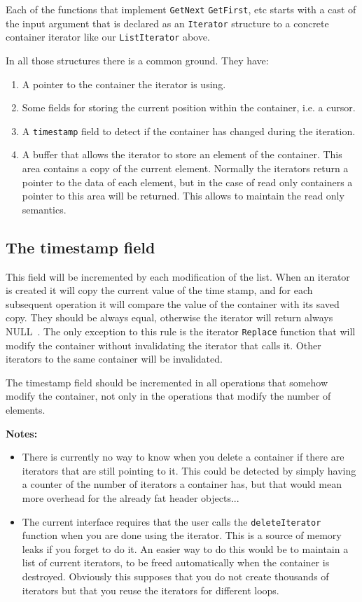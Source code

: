 \documentclass[12pt,a4paper]{memoir} %
\newif\iftth
\newcommand{\notes}{
\par \noindent \textbf{Notes:}\par\noindent}
\newcommand{\Null}{{\iftth \ NULL \else \footnotesize NULL\  \fi}}
\begin{document}
{{\begin{itemize}
Each of the functions that implement \texttt{GetNext} \texttt{GetFirst}, etc starts with a cast of the input argument that is declared as an 
\texttt{Iterator} structure to a concrete container iterator like our \texttt{ListIterator} above.

In all those structures there is a common ground. They have:
\begin{enumerate}
\item A pointer to the container the iterator is using.
\item Some fields for storing the current position within the container, i.e. a cursor.
\item A \texttt{timestamp} field to detect if the container has changed during the iteration.
\item A buffer that allows the iterator to store an element of the container. This area contains a copy of the current element. Normally the
iterators return a pointer to the data of each element, but in the case of read only containers a pointer to this area will be returned. 
This allows to maintain the read only semantics.
\end{enumerate}
\end{itemize}
\subsection{The timestamp field}
This field will be incremented by each modification of the list. When an iterator is created it will copy the current value of the time stamp, and for
each subsequent operation it will compare the value of the container with its saved copy. They should be always equal, otherwise the iterator will
return always \Null. The only exception to this rule is the iterator \verb,Replace, function that will modify the container without invalidating
the iterator that calls it. Other iterators to the same container will be invalidated.

The timestamp field should be incremented in all operations that somehow modify the container, not only in the operations that modify the number of 
elements.
\notes{Implementation issues}
\begin{itemize}
\item
There is currently no way to know when you delete a container if there are iterators that are still
pointing to it. This could be detected by simply having a counter of the number of iterators a container has, but that would mean more overhead for the 
already fat header objects...
\item The current interface requires that the user calls the \verb,deleteIterator, function when you are done using the iterator. This is
a source of memory leaks if you forget
to do it. An easier way to do this would be to maintain a list of current iterators, to be freed automatically when the container is 
destroyed. Obviously this supposes that you do not create thousands of iterators but that you reuse the iterators for different loops.
\end{itemize}
}}
\end{document}
